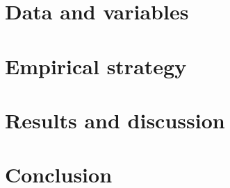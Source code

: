 \section{Data and variables}


\section{Empirical strategy}


\section{Results and discussion}


\section{Conclusion}


\clearpage
\printbibliography
\clearpage

\appendix
\renewcommand\thefigure{\thesection.\arabic{figure}}
\setcounter{figure}{0}
\setcounter{page}{1}

% 
\clearpage


